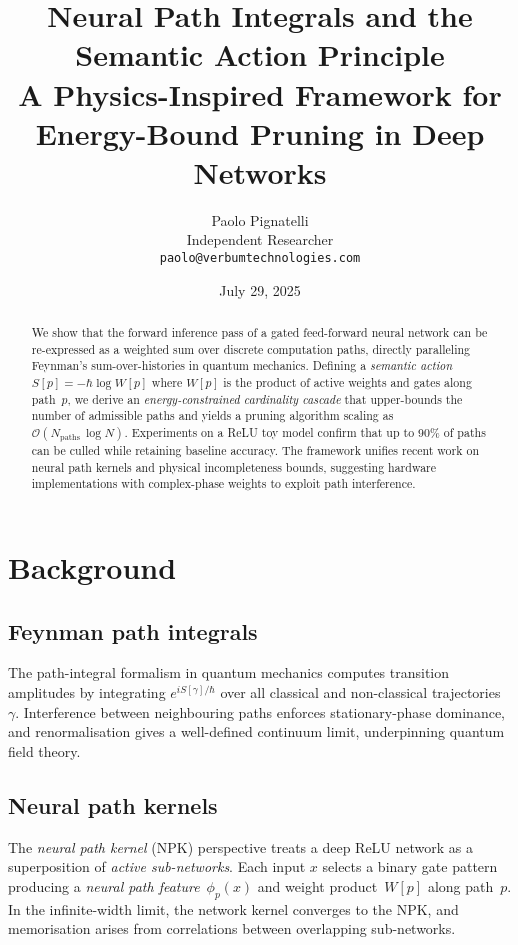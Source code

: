 \documentclass[11pt]{article}
\title{Neural Path Integrals and the Semantic Action Principle\\[2ex]
  \large A Physics-Inspired Framework for Energy-Bound Pruning in Deep Networks}
\author{Paolo Pignatelli\\Independent Researcher\\\texttt{paolo@verbumtechnologies.com}}
\date{July 29, 2025}
\begin{document}
\maketitle

\begin{abstract}
We show that the forward inference pass of a gated feed-forward neural network can be re-expressed as a weighted sum over discrete computation paths, directly paralleling Feynman’s sum-over-histories in quantum mechanics.  Defining a \emph{semantic action} $S[p] = -\hbar \log W[p]$ where $W[p]$ is the product of active weights and gates along path~$p$, we derive an \emph{energy-constrained cardinality cascade} that upper-bounds the number of admissible paths and yields a pruning algorithm scaling as $\mathcal{O}(N_{\text{paths}}\,\log N)$.  Experiments on a ReLU toy model confirm that up to 90\% of paths can be culled while retaining baseline accuracy.  The framework unifies recent work on neural path kernels and physical incompleteness bounds, suggesting hardware implementations with complex-phase weights to exploit path interference.
\end{abstract}

\section{Background}
\subsection{Feynman path integrals}
The path-integral formalism in quantum mechanics computes transition amplitudes by integrating $e^{iS[\gamma]/\hbar}$ over all classical and non-classical trajectories~$\gamma$.  Interference between neighbouring paths enforces stationary-phase dominance, and renormalisation gives a well-defined continuum limit, underpinning quantum field theory.

\subsection{Neural path kernels}
The \emph{neural path kernel} (NPK) perspective treats a deep ReLU network as a superposition of \emph{active sub-networks}.  Each input $x$ selects a binary gate pattern producing a \emph{neural path feature}~$\phi_p(x)$ and weight product~$W[p]$ along path~$p$\cite{chatterjee2020neural, pham2022path}.  In the infinite-width limit, the network kernel converges to the NPK, and memorisation arises from correlations between overlapping sub-networks.
\end{document}
